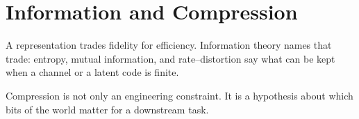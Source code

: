 \chapter{Information and Compression}
\label{ch:information}

A representation trades fidelity for efficiency. Information theory names that trade: entropy, mutual information, and rate--distortion say what can be kept when a channel or a latent code is finite.

Compression is not only an engineering constraint. It is a hypothesis about which bits of the world matter for a downstream task.
